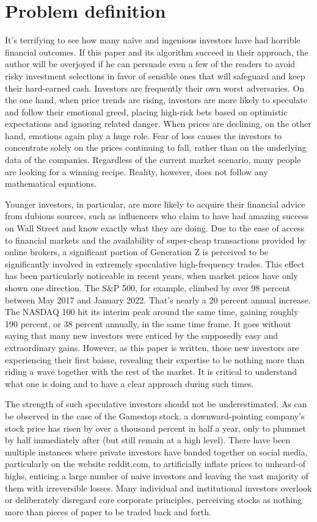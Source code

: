 \documentclass{imc-inf}
\begin{document}
\chapter{Problem definition}\label{chap:problem defintion}
It's terrifying to see how many naïve and ingenious investors have had horrible financial outcomes. If this paper and its algorithm succeed in their approach, the author will be overjoyed if he can persuade even a few of the readers to avoid risky investment selections in favor of sensible ones that will safeguard and keep their hard-earned cash.
Investors are frequently their own worst adversaries. On the one hand, when price trends are rising, investors are more likely to speculate and follow their emotional greed, placing high-risk bets based on optimistic expectations and ignoring related danger. When prices are declining, on the other hand, emotions again play a huge role. Fear of loss causes the investors to concentrate solely on the prices continuing to fall, rather than on the underlying data of the companies. Regardless of the current market scenario, many people are looking for a winning recipe. Reality, however, does not follow any mathematical equations.

Younger investors, in particular, are more likely to acquire their financial advice from dubious sources, such as influencers who claim to have had amazing success on Wall Street and know exactly what they are doing. Due to the ease of access to financial markets and the availability of super-cheap transactions provided by online brokers, a significant portion of Generation Z is perceived to be significantly involved in extremely speculative high-frequency trades. 
This effect has been particularly noticeable in recent years, when market prices have only shown one direction. The S\&P 500, for example, climbed by over 98 percent between May 2017 and January 2022. That's nearly a 20 percent annual increase. The NASDAQ 100 hit its interim peak around the same time, gaining roughly 190 percent, or 38 percent annually, in the same time frame. It goes without saying that many new investors were enticed by the supposedly easy and extraordinary gains.
However, as this paper is written, those new investors are experiencing their first baisse, revealing their expertise to be nothing more than riding a wave together with the rest of the market. It is critical to understand what one is doing and to have a clear approach during such times.

The strength of such speculative investors should not be underestimated. As can be observed in the case of the Gamestop stock, a downward-pointing company's stock price has risen by over a thousand percent in half a year, only to plummet by half immediately after (but still remain at a high level). There have been multiple instances where private investors have banded together on social media, particularly on the website reddit.com, to artificially inflate prices to unheard-of highs, enticing a large number of naive investors and leaving the vast majority of them with irreversible losses. Many individual and institutional investors overlook or deliberately disregard core corporate principles, perceiving stocks as nothing more than pieces of paper to be traded back and forth.
\end{document}
